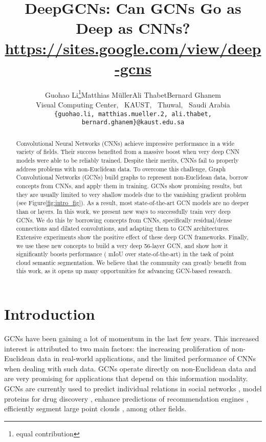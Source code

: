 \documentclass[10pt,twocolumn,letterpaper]{article}
\newcommand{\figLabel}{Figure\xspace}
\begin{document}
\title{DeepGCNs: Can GCNs Go as Deep as CNNs?\\\small\url{ https://sites.google.com/view/deep-gcns}}

\author{Guohao Li\thanks{equal contribution}\quad Matthias M\"uller\footnotemark[1]\quad Ali Thabet\quad Bernard Ghanem\\
		Visual Computing Center,~ KAUST,~ Thuwal,~ Saudi Arabia\\
		{\tt\footnotesize \{guohao.li, matthias.mueller.2, ali.thabet, bernard.ghanem\}@kaust.edu.sa}}

\maketitle


\begin{abstract}
Convolutional Neural Networks (CNNs) achieve impressive performance in a wide variety of fields. Their success benefited from a massive boost when very deep CNN models were able to be reliably trained. Despite their merits, CNNs fail to properly address problems with non-Euclidean data. To overcome this challenge, Graph Convolutional Networks (GCNs) build graphs to represent non-Euclidean data, borrow concepts from CNNs, and apply them in training. GCNs show promising results, but they are usually limited to very shallow models due to the vanishing gradient problem (see \figLabel \ref{fig:intro_fig}). As a result, most state-of-the-art GCN models are no deeper than  or  layers. In this work, we present new ways to successfully train very deep GCNs. We do this by borrowing concepts from CNNs, specifically residual/dense connections and dilated convolutions, and adapting them to GCN architectures. Extensive experiments  show the positive effect of these deep GCN frameworks. Finally, we use these new concepts to build a very deep 56-layer GCN, and show how it significantly boosts performance ( mIoU over state-of-the-art) in the task of point cloud semantic segmentation. We believe that the community can greatly benefit from this work, as it opens up many opportunities for advancing GCN-based research.
\end{abstract}

\section{Introduction}
\label{sec:introduction}
GCNs have been gaining a lot of momentum in the last few years. This increased interest is attributed to two main factors: the increasing proliferation of non-Euclidean data in real-world applications, and the limited performance of CNNs when dealing with such data. GCNs operate directly on non-Euclidean data and are very promising for applications that depend on this information modality. GCNs are currently used to predict individual relations in social networks \cite{social_tang2009relational}, model proteins for drug discovery \cite{chem_zitnik2017predicting,chem_wale2008comparison}, enhance predictions of recommendation engines \cite{rec_monti2017geometric,rec_ying2018graph}, efficiently segment large point clouds \cite{wang2018dynamic}, among other fields.
\end{document}
